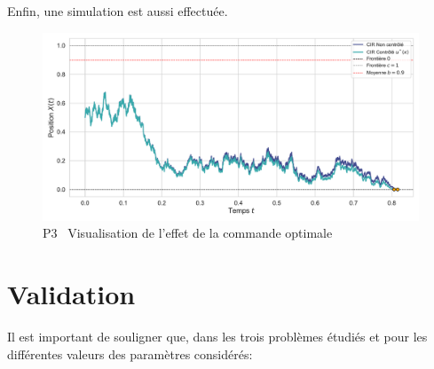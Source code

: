 \FloatBarrier Enfin, une simulation est aussi effectuée. 
\begin{figure}[htb]
    \centering
    \includegraphics[width=0.9\linewidth]{img/validation/P3/p3_control_simulation.pdf}
    \caption{P3 \textemdash~Visualisation de l'effet de la commande optimale}\label{fig:Simulation3}
\end{figure}\FloatBarrier\section{Validation}
Il est important de souligner que, dans les trois problèmes étudiés et pour les différentes valeurs des paramètres considérés:

